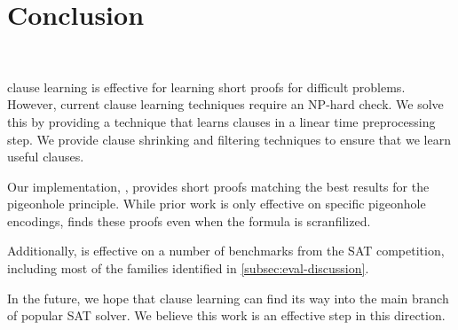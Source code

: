 \section{Conclusion}~\label{sec:conclusion}


\pr clause learning is effective for learning short proofs for 
difficult problems. However, current \pr clause learning techniques require
an NP-hard check. We solve this by providing a technique that learns \pr clauses
in a linear time preprocessing step. We provide clause shrinking and filtering 
techniques to ensure that we learn useful \pr clauses.

Our implementation, \tool, provides short \pr proofs matching the best results for 
the pigeonhole principle. While prior work is only effective on specific pigeonhole
encodings, \tool finds these proofs even when the formula is scranfilized.

Additionally, \tool is effective on a number of benchmarks from the SAT competition,
including most of the families identified in \autoref{subsec:eval-discussion}.

In the future, we hope that \pr clause learning can find its way into the main branch
of popular SAT solver. We believe this work is an effective step in this direction.


